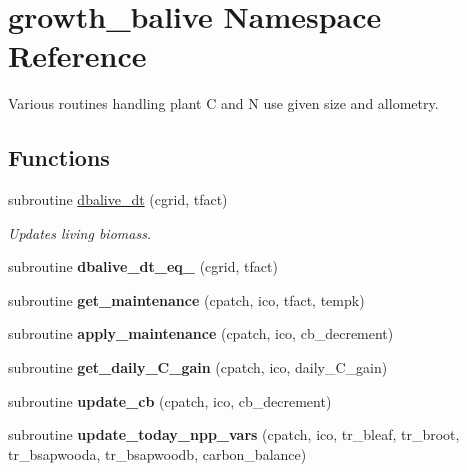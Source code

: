 \hypertarget{namespacegrowth__balive}{
\section{growth\_\-balive Namespace Reference}
\label{namespacegrowth__balive}
}


Various routines handling plant C and N use given size and allometry.  
\subsection*{Functions}
\begin{DoxyCompactItemize}
\item 
subroutine \hyperlink{namespacegrowth__balive_a7781ae229b2399c90d50858382665ee8}{dbalive\_\-dt} (cgrid, tfact)
\begin{DoxyCompactList}\small\item\em Updates living biomass. \item\end{DoxyCompactList}\item 
\hypertarget{namespacegrowth__balive_a15cba39e9b70b8dd6a1e2d0cbdd5cc2e}{
subroutine {\bfseries dbalive\_\-dt\_\-eq\_} (cgrid, tfact)}
\label{namespacegrowth__balive_a15cba39e9b70b8dd6a1e2d0cbdd5cc2e}

\item 
\hypertarget{namespacegrowth__balive_ac2f667372e6f2a5fc7329466cc958a6c}{
subroutine {\bfseries get\_\-maintenance} (cpatch, ico, tfact, tempk)}
\label{namespacegrowth__balive_ac2f667372e6f2a5fc7329466cc958a6c}

\item 
\hypertarget{namespacegrowth__balive_a861b85f31215415551f4a9c03302ff6e}{
subroutine {\bfseries apply\_\-maintenance} (cpatch, ico, cb\_\-decrement)}
\label{namespacegrowth__balive_a861b85f31215415551f4a9c03302ff6e}

\item 
\hypertarget{namespacegrowth__balive_a87bfd5551e51194040df55715abda8e7}{
subroutine {\bfseries get\_\-daily\_\-C\_\-gain} (cpatch, ico, daily\_\-C\_\-gain)}
\label{namespacegrowth__balive_a87bfd5551e51194040df55715abda8e7}

\item 
\hypertarget{namespacegrowth__balive_ac4ca7901eed6321044f171f6f1b8d7d6}{
subroutine {\bfseries update\_\-cb} (cpatch, ico, cb\_\-decrement)}
\label{namespacegrowth__balive_ac4ca7901eed6321044f171f6f1b8d7d6}

\item 
\hypertarget{namespacegrowth__balive_a6c0ddec560e65b6d58be7041bd8dade2}{
subroutine {\bfseries update\_\-today\_\-npp\_\-vars} (cpatch, ico, tr\_\-bleaf, tr\_\-broot, tr\_\-bsapwooda, tr\_\-bsapwoodb, carbon\_\-balance)}
\label{namespacegrowth__balive_a6c0ddec560e65b6d58be7041bd8dade2}


\end{DoxyCompactItemize}
